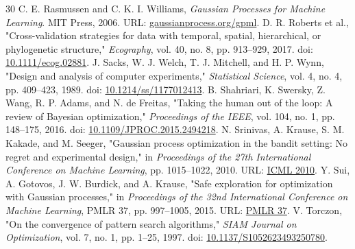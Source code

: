 \documentclass[10pt]{article}
\begin{document}
\begin{thebibliography}{30}
 C. E. Rasmussen and C. K. I. Williams, \emph{Gaussian Processes for Machine Learning}. MIT Press, 2006. URL: \href{https://gaussianprocess.org/gpml/}{gaussianprocess.org/gpml}.
 D. R. Roberts et al., "Cross-validation strategies for data with temporal, spatial, hierarchical, or phylogenetic structure," \emph{Ecography}, vol. 40, no. 8, pp. 913--929, 2017. doi: \href{https://doi.org/10.1111/ecog.02881}{10.1111/ecog.02881}.
 J. Sacks, W. J. Welch, T. J. Mitchell, and H. P. Wynn, "Design and analysis of computer experiments," \emph{Statistical Science}, vol. 4, no. 4, pp. 409--423, 1989. doi: \href{https://doi.org/10.1214/ss/1177012413}{10.1214/ss/1177012413}.
 B. Shahriari, K. Swersky, Z. Wang, R. P. Adams, and N. de Freitas, "Taking the human out of the loop: A review of Bayesian optimization," \emph{Proceedings of the IEEE}, vol. 104, no. 1, pp. 148--175, 2016. doi: \href{https://doi.org/10.1109/JPROC.2015.2494218}{10.1109/JPROC.2015.2494218}.
 N. Srinivas, A. Krause, S. M. Kakade, and M. Seeger, "Gaussian process optimization in the bandit setting: No regret and experimental design," in \emph{Proceedings of the 27th International Conference on Machine Learning}, pp. 1015--1022, 2010. URL: \href{https://icml.cc/Conferences/2010/papers/422.pdf}{ICML 2010}.
 Y. Sui, A. Gotovos, J. W. Burdick, and A. Krause, "Safe exploration for optimization with Gaussian processes," in \emph{Proceedings of the 32nd International Conference on Machine Learning}, PMLR 37, pp. 997--1005, 2015. URL: \href{https://proceedings.mlr.press/v37/sui15.html}{PMLR 37}.
 V. Torczon, "On the convergence of pattern search algorithms," \emph{SIAM Journal on Optimization}, vol. 7, no. 1, pp. 1--25, 1997. doi: \href{https://doi.org/10.1137/S1052623493250780}{10.1137/S1052623493250780}.
\end{thebibliography}
\end{document}
